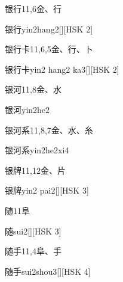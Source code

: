 \begin{entry}{银行}{11,6}{⾦、⾏}
  \begin{phonetics}{银行}{yin2hang2}[][HSK 2]
  \end{phonetics}
\end{entry}

\begin{entry}{银行卡}{11,6,5}{⾦、⾏、⼘}
  \begin{phonetics}{银行卡}{yin2 hang2 ka3}[][HSK 2]
  \end{phonetics}
\end{entry}

\begin{entry}{银河}{11,8}{⾦、⽔}
  \begin{phonetics}{银河}{yin2he2}
  \end{phonetics}
\end{entry}

\begin{entry}{银河系}{11,8,7}{⾦、⽔、⽷}
  \begin{phonetics}{银河系}{yin2he2xi4}
  \end{phonetics}
\end{entry}

\begin{entry}{银牌}{11,12}{⾦、⽚}
  \begin{phonetics}{银牌}{yin2 pai2}[][HSK 3]
  \end{phonetics}
\end{entry}

\begin{entry}{随}{11}{⾩}
  \begin{phonetics}{随}{sui2}[][HSK 3]
  \end{phonetics}
\end{entry}

\begin{entry}{随手}{11,4}{⾩、⼿}
  \begin{phonetics}{随手}{sui2shou3}[][HSK 4]
  \end{phonetics}
\end{entry}

